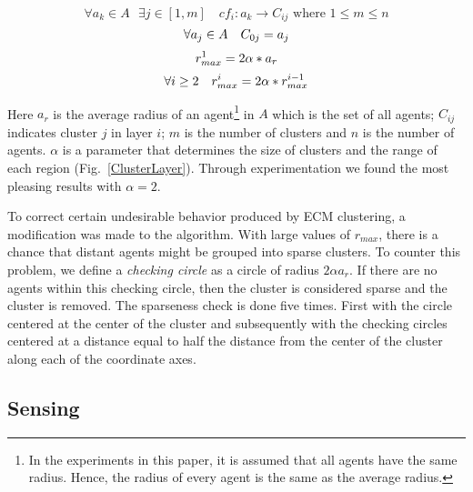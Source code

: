 \documentclass[runningheads,a4paper]{llncs}
\begin{document}
\begin{equation}
   \forall a_{k} {\in} A \mbox{ }\exists j \in  [1 , m] \quad cf_{i} : a_{k} {\rightarrow} C_{ij} \mbox{ where } 1 {\leq} m {\leq} n
\end{equation}
\begin{equation}
  \\ \forall a_{j} \in A \quad C_{0j} = a_{j}
\end{equation}  
\begin{equation}
 \\r^{1}_{max} = 2 \alpha * a_{r}
  \label{firstLayerEq}
\end{equation}
\begin{equation}
  \\ \forall i \geq 2 \quad   r^{i}_{max} = 2 \alpha * r ^{i-1} _{max}  
   \label{secondLayerEq}
\end{equation}

Here $a_{r}$ is the average radius of an agent\footnote{In the experiments in this paper, it is assumed that all agents have the same radius. Hence, the radius of every agent is the same as the average radius.} in $A$ which is the set of all agents; $C_{ij}$ indicates cluster $j$ in layer $i$; $m$ is the number of clusters and $n$ is the number of agents. $\alpha$ is a parameter that determines the size of clusters and the range of each region (Fig.~\ref{ClusterLayer}). Through experimentation we found the most pleasing results with $\alpha = 2$.

To correct certain undesirable behavior produced by ECM clustering, a modification was made to the algorithm. With large values of $r_{max}$, there is a chance that distant agents might be grouped into sparse clusters. To counter this problem, we define a \emph{checking circle} as a circle of radius $2 \alpha a_{r}$. If there are no agents within this checking circle, then the cluster is considered sparse and the cluster is removed. The sparseness check is done five times. First with the circle centered at the center of the cluster and subsequently with the checking circles centered at a distance equal to half the distance from the center of the cluster along each of the coordinate axes.

\subsection{Sensing}
\label{perceptionDescription}
\end{document}
